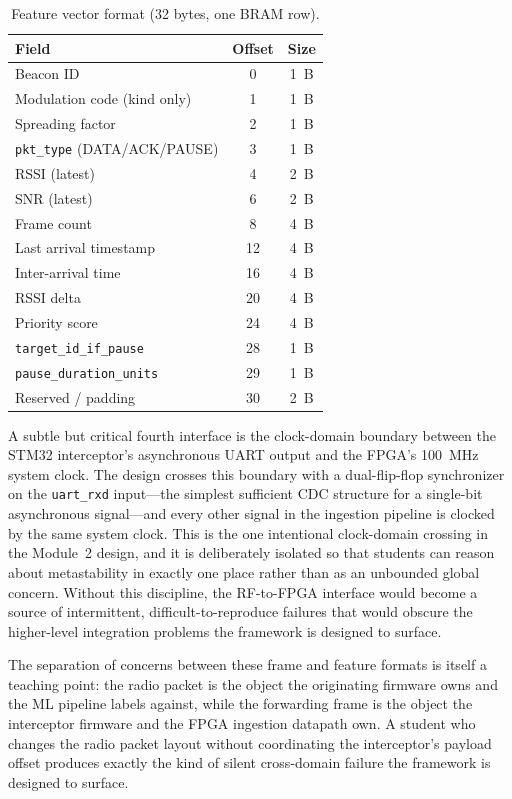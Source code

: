 \documentclass[conference]{IEEEtran}
\begin{document}
\begin{table}[t]
\centering
\caption{Feature vector format (32 bytes, one BRAM row).}
\label{tab:featvec}
\begin{tabular}{l c c}
\toprule
\textbf{Field} & \textbf{Offset} & \textbf{Size} \\
\midrule
Beacon ID                 & 0  & 1~B \\
Modulation code (kind only)& 1 & 1~B \\
Spreading factor          & 2  & 1~B \\
\texttt{pkt\_type} (DATA/ACK/PAUSE) & 3 & 1~B \\
RSSI (latest)             & 4  & 2~B \\
SNR (latest)              & 6  & 2~B \\
Frame count               & 8  & 4~B \\
Last arrival timestamp    & 12 & 4~B \\
Inter-arrival time        & 16 & 4~B \\
RSSI delta                & 20 & 4~B \\
Priority score            & 24 & 4~B \\
\texttt{target\_id\_if\_pause} & 28 & 1~B \\
\texttt{pause\_duration\_units} & 29 & 1~B \\
Reserved / padding        & 30 & 2~B \\
\bottomrule
\end{tabular}
\end{table}

A subtle but critical fourth interface is the clock-domain boundary between the STM32 interceptor's asynchronous UART output and the FPGA's 100~MHz system clock. The design crosses this boundary with a dual-flip-flop synchronizer on the \texttt{uart\_rxd} input---the simplest sufficient CDC structure for a single-bit asynchronous signal---and every other signal in the ingestion pipeline is clocked by the same system clock. This is the one intentional clock-domain crossing in the Module~2 design, and it is deliberately isolated so that students can reason about metastability in exactly one place rather than as an unbounded global concern. Without this discipline, the RF-to-FPGA interface would become a source of intermittent, difficult-to-reproduce failures that would obscure the higher-level integration problems the framework is designed to surface.

The separation of concerns between these frame and feature formats is itself a teaching point: the radio packet is the object the originating firmware owns and the ML pipeline labels against, while the forwarding frame is the object the interceptor firmware and the FPGA ingestion datapath own. A student who changes the radio packet layout without coordinating the interceptor's payload offset produces exactly the kind of silent cross-domain failure the framework is designed to surface.
\end{document}
